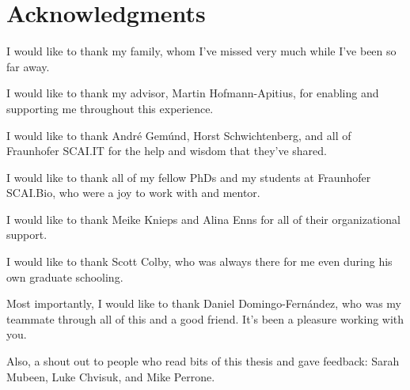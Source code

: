 \chapter*{Acknowledgments}

I would like to thank my family, whom I've missed very much while I've been so far away.

I would like to thank my advisor, Martin Hofmann-Apitius, for enabling and supporting me throughout this experience.

I would like to thank Andr\'e Gem\'und, Horst Schwichtenberg, and all of Fraunhofer SCAI.IT for the help and wisdom that they've shared.

I would like to thank all of my fellow PhDs and my students at Fraunhofer SCAI.Bio, who were a joy to work with and mentor.

I would like to thank Meike Knieps and Alina Enns for all of their organizational support.

I would like to thank Scott Colby, who was always there for me even during his own graduate schooling.

Most importantly, I would like to thank Daniel Domingo-Fern\'andez, who was my teammate through all of this and a good friend.
It's been a pleasure working with you.

\vspace*{\fill}

Also, a shout out to people who read bits of this thesis and gave feedback: Sarah Mubeen, Luke Chvisuk, and Mike Perrone.
